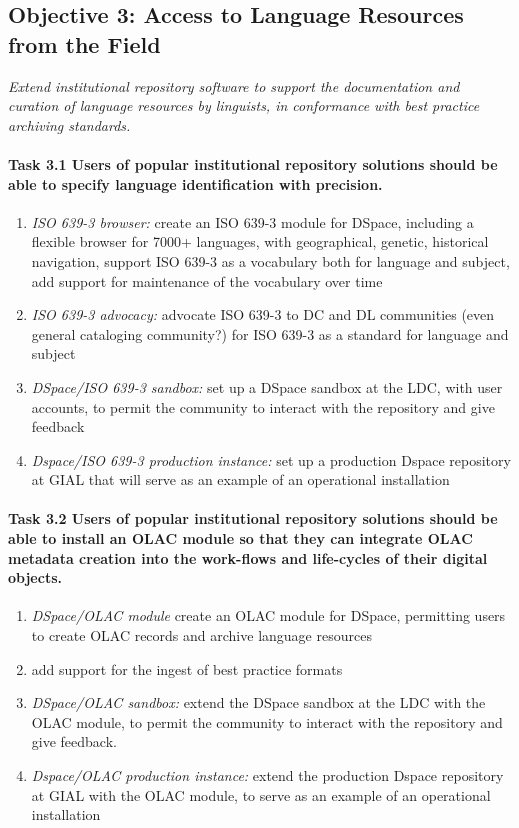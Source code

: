\subsection*{Objective 3: Access to Language Resources from the Field}

\emph{Extend institutional repository software to support the
    documentation and curation of language resources by linguists,
    in conformance with best practice archiving standards.}

\def\task{3.1}
\paragraph{Task {\task} Users of popular institutional repository solutions should be able
  to specify language identification with precision.}

\begin{enumerate}[label=\emph{\task\alph*}]
\item \emph{ISO 639-3 browser:}
  create an ISO 639-3 module for DSpace, including a flexible
  browser for 7000+ languages, with geographical, genetic, historical
  navigation, support ISO 639-3 as a vocabulary both for language and subject,
  add support for maintenance of the vocabulary over time
\item \emph{ISO 639-3 advocacy:}
  advocate ISO 639-3 to DC and DL communities (even general cataloging
  community?) for ISO 639-3 as a standard for language and subject
\item \emph{DSpace/ISO 639-3 sandbox:}
  set up a DSpace sandbox at the LDC, with user accounts,
  to permit the community to interact with the repository and give feedback
\item \emph{Dspace/ISO 639-3 production instance:}
  set up a production Dspace repository at GIAL that will serve
  as an example of an operational installation 
\end{enumerate}

\def\task{3.2}
\paragraph{Task {\task} Users of popular institutional repository solutions should be
    able to install an OLAC module so that they can integrate OLAC
    metadata creation into the work-flows and life-cycles of their
    digital objects.}

\begin{enumerate}[label=\emph{\task\alph*}]
\item \emph{DSpace/OLAC module}
  create an OLAC module for DSpace, permitting users to create OLAC
  records and archive language resources
\item add support for the ingest of best practice formats
\item \emph{DSpace/OLAC sandbox:}
  extend the DSpace sandbox at the LDC with the OLAC module,
  to permit the community to interact with the repository and give feedback.
\item \emph{Dspace/OLAC production instance:}
  extend the production Dspace repository at GIAL with the OLAC
  module, to serve as an example of an operational installation 
\end{enumerate}

